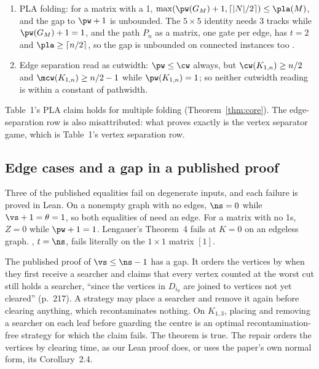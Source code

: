 \begin{theorem}\label{thm:false}
\leavevmode
\begin{enumerate}
\item PLA folding: for a matrix with a 1,
  $\max(\pw(G_M)+1,\lceil|N|/2\rceil)\le\pla(M)$, and the gap to $\pw+1$ is
  unbounded. The $5\times5$ identity needs 3 tracks while $\pw(G_M)+1=1$, and the
  path $P_n$ as a matrix, one gate per edge, has $t=2$ and
  $\pla\ge\lceil n/2\rceil$, so the gap is unbounded on connected instances too
  \citep[Prop.~3.15]{LY2002ref6}.
\item Edge separation read as cutwidth: $\pw\le\cw$ always, but
  $\cw(K_{1,n})\ge n/2$ and $\mcw(K_{1,n})\ge n/2-1$ while $\pw(K_{1,n})=1$; so
  neither cutwidth reading is within a constant of pathwidth.
\end{enumerate}
\end{theorem}
Table~1's PLA claim holds for multiple folding (Theorem~\ref{thm:core}). The
edge-separation row is also misattributed: what \citet{LY2002ref14} proves
exactly is the vertex separator game, which is Table~1's vertex separation row.

\subsection{Edge cases and a gap in a published proof}

Three of the published equalities fail on degenerate inputs, and each failure
is proved in Lean. On a nonempty graph with no edges, $\ns=0$ while
$\vs+1=\theta=1$, so both equalities of \citet{LY2002ref9,LY2002ref10} need an
edge.
For a matrix with no 1s, $Z=0$ while $\pw+1=1$. Lengauer's Theorem~4 fails at
$K=0$ on an edgeless graph.
\citet[Thm~3.9]{LY2002ref6}, $t=\ns$, fails literally on the $1\times1$ matrix
$[1]$.

The published proof of $\vs\le\ns-1$ \citep[Thm~4.1]{LY2002ref10} has a gap. It
orders the vertices by when they first receive a searcher and claims that every
vertex counted at the worst cut still holds a searcher, ``since the vertices in
$D_{i_0}$ are joined to vertices not yet cleared'' (p.~217). A strategy may place
a searcher and remove it again before clearing anything, which recontaminates
nothing. On $K_{1,3}$, placing and removing a searcher on each leaf before
guarding the centre is an optimal recontamination-free strategy for which the
claim fails. The theorem is true. The
repair orders the vertices by clearing time, as our Lean proof does, or uses the
paper's own normal form, its Corollary~2.4.

